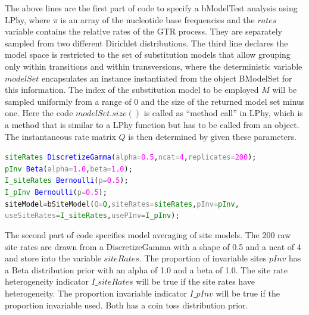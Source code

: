 \documentclass[10pt,letterpaper,table]{article}
\begin{document}
{The above lines are the first part of code to specify a bModelTest analysis using LPhy, 
where $\pi$ is an array of the nucleotide base frequencies and the $rates$ variable contains the relative rates of the GTR process. They are separately sampled from two different Dirichlet distributions.  
The third line declares the model space is restricted to the set of substitution models that allow grouping only within transitions and within transversions\cite{bouckaert2019beastanalysis}, where the deterministic variable $modelSet$ encapsulates an instance instantiated from the object BModelSet for this information.
The index of the substitution model to be employed $M$ will be sampled uniformly from a range of 0 and the size of the returned model set minus one.
Here the code $modelSet.size()$ is called as ``method call'' in LPhy, which is a method that is similar to a LPhy function but has to be called from an object. 
The instantaneous rate matrix $Q$ is then determined by given these parameters.
  
{\small
  \begin{alltt}  
    \textcolor{green}{siteRates} ~ \textcolor{blue}{DiscretizeGamma}(\textcolor{gray}{alpha=}\textcolor{magenta}{0.5}, \textcolor{gray}{ncat=}\textcolor{magenta}{4}, \textcolor{gray}{replicates=}\textcolor{magenta}{200});
    \textcolor{green}{pInv} ~ \textcolor{blue}{Beta}(\textcolor{gray}{alpha=}\textcolor{magenta}{1.0},\textcolor{gray}{beta=}\textcolor{magenta}{1.0});
    \textcolor{green}{I_siteRates} ~ \textcolor{blue}{Bernoulli}(\textcolor{gray}{p=}\textcolor{magenta}{0.5});
    \textcolor{green}{I_pInv} ~ \textcolor{blue}{Bernoulli}(\textcolor{gray}{p=}\textcolor{magenta}{0.5});
    \textcolor{black}{siteModel = }\textcolor{magenta!80!black}{bSiteModel}(\textcolor{gray}{Q=}\textcolor{green}{Q}, \textcolor{gray}{siteRates=}\textcolor{green}{siteRates}, \textcolor{gray}{pInv=}\textcolor{green}{pInv}, \\ \textcolor{gray}{useSiteRates=}\textcolor{green}{I_siteRates}, \textcolor{gray}{usePInv=}\textcolor{green}{I_pInv}); 
  \end{alltt}
}

The second part of code specifies model averaging of site models.
The 200 raw site rates are drawn from a DiscretizeGamma with a shape of 0.5 and a ncat of 4 and store into the variable $siteRates$.
The proportion of invariable sites $pInv$ has a Beta distribution prior with an alpha of 1.0 and a beta of 1.0. 
The site rate heterogeneity indicator $I\_siteRates$ will be true if the site rates have heterogeneity.
The proportion invariable indicator $I\_pInv$ will be true if the proportion invariable used.
Both has a coin toss distribution prior. 

}
\end{document}
